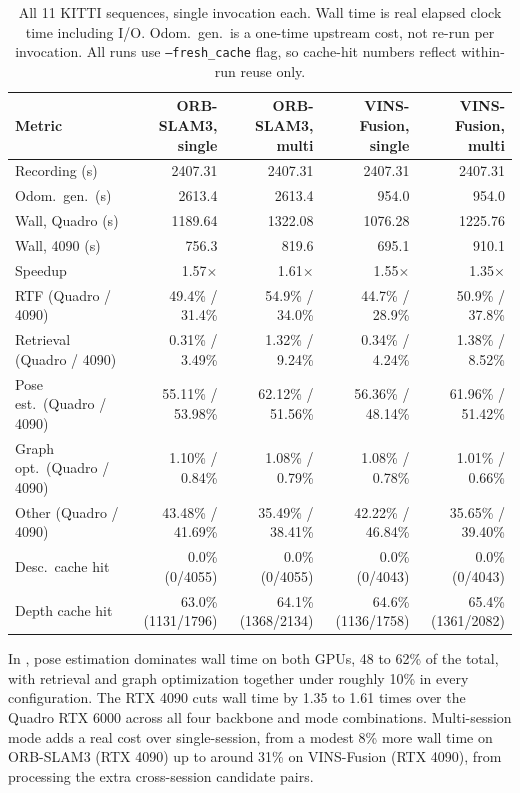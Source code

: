 \begin{table}[htb]
  \centering
  \scriptsize
  \begin{tabular*}{\textwidth}{@{\extracolsep{\fill}} lrrrr}
  \hline
  \textbf{Metric} & \textbf{ORB-SLAM3, single} & \textbf{ORB-SLAM3, multi} & \textbf{VINS-Fusion, single} & \textbf{VINS-Fusion, multi} \\
  \hline
  Recording (s) & 2407.31 & 2407.31 & 2407.31 & 2407.31 \\
  Odom.\ gen.\ (s) & 2613.4 & 2613.4 & 954.0 & 954.0 \\
  Wall, Quadro (s) & 1189.64 & 1322.08 & 1076.28 & 1225.76 \\
  Wall, 4090 (s) & 756.3 & 819.6 & 695.1 & 910.1 \\
  Speedup & 1.57$\times$ & 1.61$\times$ & 1.55$\times$ & 1.35$\times$ \\
  RTF (Quadro / 4090) & 49.4\% / 31.4\% & 54.9\% / 34.0\% & 44.7\% / 28.9\% & 50.9\% / 37.8\% \\
  Retrieval (Quadro / 4090) & 0.31\% / 3.49\% & 1.32\% / 9.24\% & 0.34\% / 4.24\% & 1.38\% / 8.52\% \\
  Pose est.\ (Quadro / 4090) & 55.11\% / 53.98\% & 62.12\% / 51.56\% & 56.36\% / 48.14\% & 61.96\% / 51.42\% \\
  Graph opt.\ (Quadro / 4090) & 1.10\% / 0.84\% & 1.08\% / 0.79\% & 1.08\% / 0.78\% & 1.01\% / 0.66\% \\
  Other (Quadro / 4090) & 43.48\% / 41.69\% & 35.49\% / 38.41\% & 42.22\% / 46.84\% & 35.65\% / 39.40\% \\
  Desc.\ cache hit & 0.0\% (0/4055) & 0.0\% (0/4055) & 0.0\% (0/4043) & 0.0\% (0/4043) \\
  Depth cache hit & 63.0\% (1131/1796) & 64.1\% (1368/2134) & 64.6\% (1136/1758) & 65.4\% (1361/2082) \\
  \hline
  \end{tabular*}
  \caption[KITTI wall time and phase breakdown]{All 11 KITTI sequences, single invocation each.
    Wall time is real elapsed clock time including I/O. Odom.\ gen.\ is a one-time upstream cost,
    not re-run per invocation. All runs use \texttt{--fresh\_cache} flag, so cache-hit numbers reflect within-run reuse only.}
  \label{tab:ablation-timing-kitti}
\end{table}

In , pose estimation dominates wall time on both GPUs, 48 to
62\% of the total, with retrieval and graph optimization together under roughly 10\% in every
configuration. The RTX 4090 cuts wall time
by 1.35 to 1.61 times over the Quadro RTX 6000 across all four backbone and mode combinations.
Multi-session mode adds a real cost over single-session, from a modest 8\% more wall time on
ORB-SLAM3 (RTX 4090) up to around 31\% on VINS-Fusion (RTX 4090), from processing the extra
cross-session candidate pairs.

